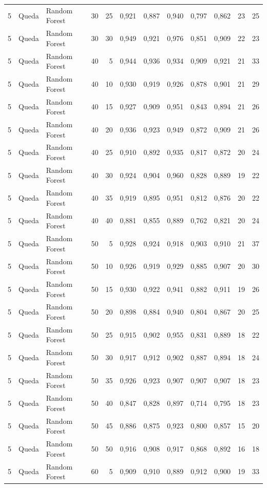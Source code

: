 \begin{longtable}{@{}rllrrrrrrrrr@{}}
5 & Queda & Random Forest & 30 & 25 & 0,921 & 0,887 & 0,940 & 0,797 & 0,862 & 23 & 25 \\
5 & Queda & Random Forest & 30 & 30 & 0,949 & 0,921 & 0,976 & 0,851 & 0,909 & 22 & 23 \\
5 & Queda & Random Forest & 40 & 5 & 0,944 & 0,936 & 0,934 & 0,909 & 0,921 & 21 & 33 \\
5 & Queda & Random Forest & 40 & 10 & 0,930 & 0,919 & 0,926 & 0,878 & 0,901 & 21 & 29 \\
5 & Queda & Random Forest & 40 & 15 & 0,927 & 0,909 & 0,951 & 0,843 & 0,894 & 21 & 26 \\
5 & Queda & Random Forest & 40 & 20 & 0,936 & 0,923 & 0,949 & 0,872 & 0,909 & 21 & 26 \\
5 & Queda & Random Forest & 40 & 25 & 0,910 & 0,892 & 0,935 & 0,817 & 0,872 & 20 & 24 \\
5 & Queda & Random Forest & 40 & 30 & 0,924 & 0,904 & 0,960 & 0,828 & 0,889 & 19 & 22 \\
5 & Queda & Random Forest & 40 & 35 & 0,919 & 0,895 & 0,951 & 0,812 & 0,876 & 20 & 22 \\
5 & Queda & Random Forest & 40 & 40 & 0,881 & 0,855 & 0,889 & 0,762 & 0,821 & 20 & 24 \\
5 & Queda & Random Forest & 50 & 5 & 0,928 & 0,924 & 0,918 & 0,903 & 0,910 & 21 & 37 \\
5 & Queda & Random Forest & 50 & 10 & 0,926 & 0,919 & 0,929 & 0,885 & 0,907 & 20 & 30 \\
5 & Queda & Random Forest & 50 & 15 & 0,930 & 0,922 & 0,941 & 0,882 & 0,911 & 19 & 26 \\
5 & Queda & Random Forest & 50 & 20 & 0,898 & 0,884 & 0,940 & 0,804 & 0,867 & 20 & 25 \\
5 & Queda & Random Forest & 50 & 25 & 0,915 & 0,902 & 0,955 & 0,831 & 0,889 & 18 & 22 \\
5 & Queda & Random Forest & 50 & 30 & 0,917 & 0,912 & 0,902 & 0,887 & 0,894 & 18 & 24 \\
5 & Queda & Random Forest & 50 & 35 & 0,926 & 0,923 & 0,907 & 0,907 & 0,907 & 18 & 23 \\
5 & Queda & Random Forest & 50 & 40 & 0,847 & 0,828 & 0,897 & 0,714 & 0,795 & 18 & 23 \\
5 & Queda & Random Forest & 50 & 45 & 0,886 & 0,875 & 0,923 & 0,800 & 0,857 & 15 & 20 \\
5 & Queda & Random Forest & 50 & 50 & 0,916 & 0,908 & 0,917 & 0,868 & 0,892 & 16 & 18 \\
5 & Queda & Random Forest & 60 & 5 & 0,909 & 0,910 & 0,889 & 0,912 & 0,900 & 19 & 33 \\

\end{longtable}

